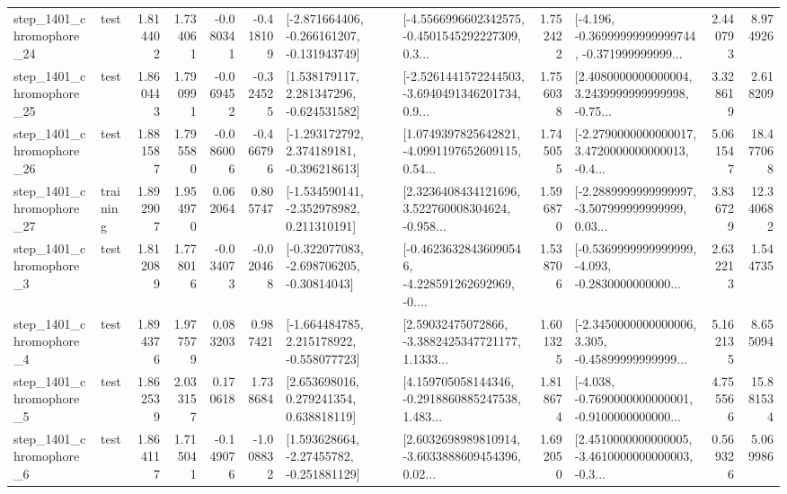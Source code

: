 \begin{tabular}{llrrrrllrlrr}
 step\_1401\_chromophore\_24 &      test &      1.814402 &    1.734061 &     -0.080341 & -0.418109 &  [-2.871664406, -0.266161207, -0.131943749] &  [-4.5566996602342575, -0.4501545292227309, 0.3... &       1.752422 &  [-4.196, -0.36999999999999744, -0.371999999999... &            2.440793 &          8.974926 \\
 step\_1401\_chromophore\_25 &      test &      1.860443 &    1.790991 &     -0.069452 & -0.324525 &    [1.538179117, 2.281347296, -0.624531582] &  [-2.5261441572244503, -3.6940491346201734, 0.9... &       1.756038 &  [2.4080000000000004, 3.2439999999999998, -0.75... &            3.328619 &          2.618209 \\
 step\_1401\_chromophore\_26 &      test &      1.881587 &    1.795580 &     -0.086006 & -0.466796 &   [-1.293172792, 2.374189181, -0.396218613] &  [1.0749397825642821, -4.0991197652609115, 0.54... &       1.745055 &  [-2.2790000000000017, 3.4720000000000013, -0.4... &            5.061547 &         18.477068 \\
 step\_1401\_chromophore\_27 &  training &      1.892907 &    1.954970 &      0.062064 &  0.805747 &   [-1.534590141, -2.352978982, 0.211310191] &  [2.3236408434121696, 3.522760008304624, -0.958... &       1.596870 &  [-2.2889999999999997, -3.507999999999999, 0.03... &            3.836729 &         12.340682 \\
  step\_1401\_chromophore\_3 &      test &      1.812089 &    1.778016 &     -0.034073 & -0.020468 &   [-0.322077083, -2.698706205, -0.30814043] &  [-0.46236328436090546, -4.228591262692969, -0.... &       1.538706 &  [-0.5369999999999999, -4.093, -0.2830000000000... &            2.632213 &          1.544735 \\
  step\_1401\_chromophore\_4 &      test &      1.894376 &    1.977579 &      0.083203 &  0.987421 &   [-1.664484785, 2.215178922, -0.558077723] &  [2.59032475072866, -3.3882425347721177, 1.1333... &       1.601325 &  [-2.3450000000000006, 3.305, -0.45899999999999... &            5.162135 &          8.655094 \\
  step\_1401\_chromophore\_5 &      test &      1.862539 &    2.033157 &      0.170618 &  1.738684 &     [2.653698016, 0.279241354, 0.638818119] &  [4.159705058144346, -0.2918860885247538, 1.483... &       1.818674 &  [-4.038, -0.7690000000000001, -0.9100000000000... &            4.755566 &         15.881534 \\
  step\_1401\_chromophore\_6 &      test &      1.864117 &    1.715041 &     -0.149076 & -1.008832 &    [1.593628664, -2.27455782, -0.251881129] &  [2.6032698989810914, -3.6033888609454396, 0.02... &       1.692050 &  [2.4510000000000005, -3.4610000000000003, -0.3... &            0.569326 &          5.069986 \\

\end{tabular}

